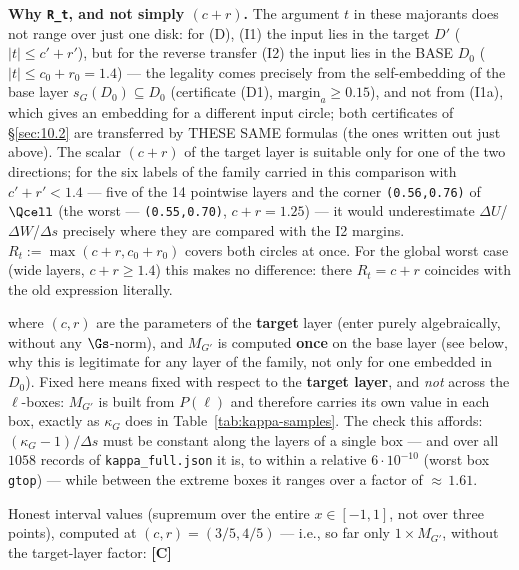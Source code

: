 \textbf{Why \texttt{R\_t}, and not simply $(c+r)$.} The argument $t$ in these majorants
does not range over just one disk: for (D), (I1) the input lies in the target $D'$
($|t|\le c'+r'$), but for the reverse transfer (I2) the input lies in the BASE $D_{0}$
($|t|\le c_{0}+r_{0}=1.4$) --- the legality comes precisely from the self-embedding of the base layer
$s_{G}(D_{0})\subseteq D_{0}$ (certificate (D1), $\mathrm{margin}_a \ge 0.15$), and not from (I1a), which gives
an embedding for a different input circle; both certificates of \S\ref{sec:10.2} are transferred by THESE
SAME formulas (the ones written out just above). The scalar $(c+r)$ of the target layer is suitable only for one
of the two directions; for the six labels of the family carried in this
comparison with $c'+r'<1.4$ --- five of the 14 pointwise layers and the
corner \texttt{(0.56,0.76)} of $\Qcell$ (the worst ---
\texttt{(0.55,0.70)}, $c+r=1.25$) --- it would underestimate $\Delta U$/$\Delta W$/$\Delta s$ precisely where they are
compared with the I2 margins. $R_t := \max(c+r, c_{0}+r_{0})$ covers both circles at once.
For the global worst case (wide layers, $c+r\ge 1.4$) this makes no difference: there
$R_t=c+r$ coincides with the old expression literally.

where $(c,r)$ are the parameters of the \textbf{target} layer (enter purely algebraically, without
any $\Gs$-norm), and $M_{G'}$ is computed \textbf{once} on the base layer
(see below, why this is legitimate for any layer of the family, not only for one embedded in $D_{0}$).
Fixed here means fixed with respect to the \textbf{target layer}, and \emph{not} across the $\ell$-boxes:
$M_{G'}$ is built from $P(\ell)$ and therefore carries its own value in each box, exactly as
$\kappa_G$ does in Table~\ref{tab:kappa-samples}. The check this affords: $(\kappa_G-1)/\Delta s$ must be constant
along the layers of a single box --- and over all $1058$ records of \texttt{kappa\_\allowbreak full.json}
it is, to within a relative $6\cdot 10^{-10}$ (worst box \texttt{gtop}) --- while between the extreme boxes it ranges over a factor
of ${\approx}\,1.61$.

Honest interval values (supremum over the entire $x \in [-1,1]$, not over three points),
computed at $(c,r) = (3/5,4/5)$ --- i.e., so far only $1\times M_{G'}$, without the target-layer factor: \textbf{[C]}

